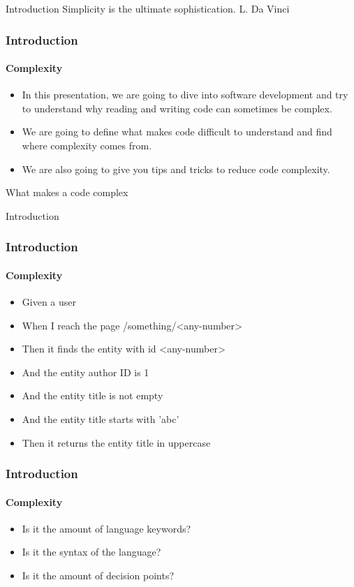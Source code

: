 \begin{sepframe}{Introduction}
    {\scriptsize{Simplicity is the ultimate sophistication. L. Da Vinci}}
\end{sepframe}

\begin{frame}
    \frametitle{Introduction}
    \framesubtitle{Complexity}

    \begin{itemize}[<+->]
        \item In this presentation, we are going to dive into software development
        and try to understand why reading and writing code can sometimes be
        complex.
        \item We are going to define what makes code difficult to understand and
        find where complexity comes from.
        \item We are also going to give you tips and tricks to reduce code complexity.
    \end{itemize}
\end{frame}

\begin{frame}
    What makes a code complex
\end{frame}

\begin{frame}{Introduction}
    \frametitle{Introduction}
    \framesubtitle{Complexity}

    \begin{itemize}[<+->]
        \item Given a user
        \item When I reach the page /something/<any-number>
        \item Then it finds the entity with id <any-number>
        \item And the entity author ID is 1
        \item And the entity title is not empty
        \item And the entity title starts with 'abc'
        \item Then it returns the entity title in uppercase
    \end{itemize}
\end{frame}

\begin{frame}[fragile,c]
    
\end{frame}

\begin{frame}
    \frametitle{Introduction}
    \framesubtitle{Complexity}

    \begin{itemize}[<+->]
        \item Is it the amount of language keywords?
        \item Is it the syntax of the language?
        \item Is it the amount of decision points?
    \end{itemize}
\end{frame}

